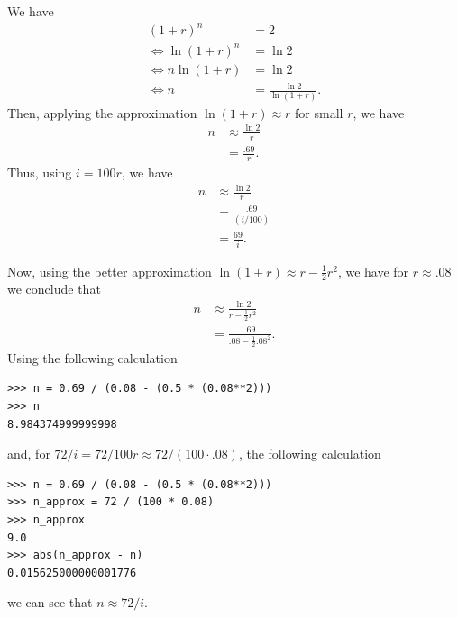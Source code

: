 We have
\begin{equation*}
    \begin{split}
        {(1 + r)}^n &= 2 \\
        \Leftrightarrow \ln{{(1 + r)}^n} &= \ln{2} \\
        \Leftrightarrow n\ln{(1 + r)} &= \ln{2} \\
        \Leftrightarrow n &= \frac{\ln{2}}{\ln{(1 + r)}}.
    \end{split}
\end{equation*}
Then, applying the approximation $\ln{(1 + r)} \approx r$ for small $r$, we
have
\begin{equation*}
    \begin{split}
        n &\approx \frac{\ln{2}}{r} \\
        &= \frac{.69}{r}.
    \end{split}
\end{equation*}
Thus, using $i = 100r$, we have
\begin{equation*}
    \begin{split}
        n &\approx \frac{\ln{2}}{r} \\
        &= \frac{.69}{(i / 100)} \\
        &= \frac{69}{i}.
    \end{split}
\end{equation*}

Now, using the better approximation
$\ln{(1 + r)} \approx r - \frac{1}{2}r^2$, we have for $r \approx .08$ we
conclude that
\begin{equation*}
    \begin{split}
        n &\approx \frac{\ln{2}}{r - \frac{1}{2}r^2} \\
        &= \frac{.69}{.08 - \frac{1}{2}{.08}^2}.
    \end{split}
\end{equation*}
Using the following calculation
\begin{lstlisting}
>>> n = 0.69 / (0.08 - (0.5 * (0.08**2)))
>>> n
8.984374999999998
\end{lstlisting}
and, for $72 / i = 72 / 100r \approx 72 / (100 \cdot .08)$, the following
calculation
\begin{lstlisting}
>>> n = 0.69 / (0.08 - (0.5 * (0.08**2)))
>>> n_approx = 72 / (100 * 0.08)
>>> n_approx
9.0
>>> abs(n_approx - n)
0.015625000000001776
\end{lstlisting}
we can see that $n \approx 72 / i$.

